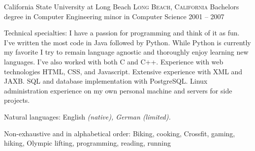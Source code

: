 \documentclass[10pt,a4paper]{article}
\begin{document}
\headedsection
  {California State University at Long Beach}
  {\textsc{Long Beach, California}} {%
  \headedsubsection
    {Bachelors degree in Computer Engineering minor in Computer Science}
    {2001 -- 2007} 
    {\bodytext{}}
}

\spacedhrule{0.5em}{-0.4em}


\inlineheadsection  %
  {Technical specialties:}
  {I have a passion for programming and think of it as fun. I've written the
  most code in Java followed by Python. While Python is currently my favorite
  I try to remain language agnostic and thoroughly enjoy learning new
  languages. I've also worked with both C and C++. Experience with web 
  technologies {HTML}, {CSS}, and {Javascript}. Extensive experience with
  {XML} and {JAXB}. {SQL} and database implementation with {PostgreSQL}. 
  Linux administration experience on my own personal machine and servers for 
  side projects.}

\inlineheadsection
  {Natural languages:}
  {English \emph{(native), German \emph{(limited)}.}}


\spacedhrule{1.6em}{-0.4em}


\inlineheadsection
  {Non-exhaustive and in alphabetical order:}
  {Biking, cooking, Crossfit, gaming, hiking, Olympic lifting, programming, reading, running}
\end{document}
